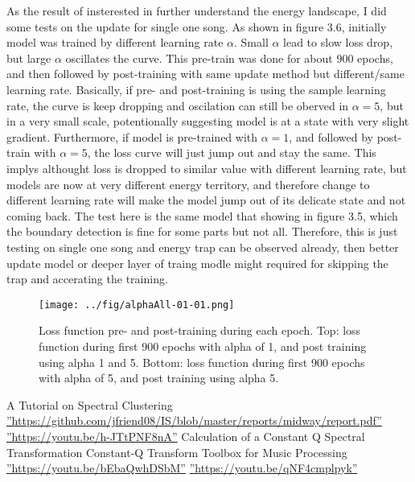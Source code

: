 \documentclass[final]{siamltexmm}
\begin{document}
As the result of insterested in further understand the energy landscape, I did some tests on the update for single one song. As shown in figure 3.6, initially model was trained by different learning rate $\alpha$. Small $\alpha$ lead to slow loss drop, but large $\alpha$ oscillates the curve. This pre-train was done for about 900 epochs, and then followed by post-training with same update method but different/same learning rate. Basically, if pre- and post-training is using the sample learning rate, the curve is keep dropping and oscilation can still be oberved in $\alpha=5$, but in a very small scale, potentionally suggesting model is at a state with very slight gradient. Furthermore, if model is pre-trained with $\alpha=1$, and followed by post-train with $\alpha=5$, the loss curve will just jump out and stay the same. This implys althought loss is dropped to similar value with different learning rate, but models are now at very different energy territory, and therefore change to different learning rate will make the model jump out of its delicate state and not coming back. The test here is the same model that showing in figure 3.5, which the boundary detection is fine for some parts but not all. Therefore, this is just testing on single one song and energy trap can be observed already, then better update model or deeper layer of traing modle might required for skipping the trap and accerating the training.
\begin{figure}[H]
\centering
   \texttt{[image: ../fig/alphaAll-01-01.png]}
\caption{Loss function pre- and post-training during each epoch. Top: loss function during first 900 epochs with alpha of 1, and post training using alpha 1 and 5. Bottom: loss function during first 900 epochs with alpha of 5, and post training using alpha 5.}
\end{figure}

\begin{thebibliography}{10}
 {\sc A Tutorial on Spectral Clustering}
 \hyperref[baseline]{''https://github.com/jfriend08/IS/blob/master/reports/midway/report.pdf''}
 \hyperref[baseline]{''https://youtu.be/h-JTtPNF8nA''}
 {\sc Calculation of a Constant Q Spectral Transformation}
 {\sc Constant-Q Transform Toolbox for Music Processing}
 \hyperref[baseline]{''https://youtu.be/bEbaQwhDSbM''}
 \hyperref[baseline]{''https://youtu.be/qNF4cmplpyk''}


\end{thebibliography}
\end{document}
